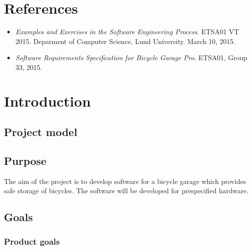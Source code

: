 \documentclass[12pt,titlepage]{article}
\begin{document}


\maketitle
\newpage
\tableofcontents
\thispagestyle{empty}
\setcounter{page}{0}
\newpage



\section{References}
\label{sec:references}

\begin{itemize}
	\item \textit{Examples and Exercises in the Software
		Engineering Process}. ETSA01 VT 2015. Deparment of Computer
		Science, Lund University. March 10, 2015.
	\item \textit{Software Requirements Specification for Bicycle Garage
		Pro}. ETSA01, Group 33, 2015.
\end{itemize}



\section{Introduction}

\subsection{Project model}

\subsection{Purpose}

The aim of the project is to develop software for a bicycle garage which
provides safe storage of bicycles. The software will be developed for
prespecified hardware.

\subsection{Goals}

\subsubsection{Product goals}
\end{document}
